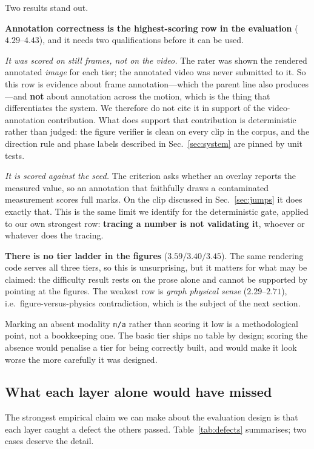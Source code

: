 \documentclass[conference]{IEEEtran}
\begin{document}
Two results stand out.

\textbf{Annotation correctness is the highest-scoring row in the evaluation}
($4.29$--$4.43$), and it needs two qualifications before it can be used.

\emph{It was scored on still frames, not on the video.} The rater was shown the
rendered annotated \emph{image} for each tier; the annotated video was never
submitted to it. So this row is evidence about frame annotation---which the
parent line also produces---and \textbf{not} about annotation across the
motion, which is the thing that differentiates the system. We therefore do not
cite it in support of the video-annotation contribution. What does support that
contribution is deterministic rather than judged: the figure verifier is clean
on every clip in the corpus, and the direction rule and phase labels described
in Sec.~\ref{sec:system} are pinned by unit tests.

\emph{It is scored against the seed.} The criterion asks whether an overlay
reports the measured value, so an annotation that faithfully draws a
contaminated measurement scores full marks. On the clip discussed in
Sec.~\ref{sec:jumps} it does exactly that. This is the same limit we identify
for the deterministic gate, applied to our own strongest row: \textbf{tracing a
number is not validating it}, whoever or whatever does the tracing.

\textbf{There is no tier ladder in the figures} ($3.59 / 3.40 / 3.45$). The
same rendering code serves all three tiers, so this is unsurprising, but it
matters for what may be claimed: the difficulty result rests on the prose
alone and cannot be supported by pointing at the figures. The weakest row is
\emph{graph physical sense} ($2.29$--$2.71$), i.e.\ figure-versus-physics
contradiction, which is the subject of the next section.

Marking an absent modality \texttt{n/a} rather than scoring it low is a
methodological point, not a bookkeeping one. The basic tier ships no table by
design; scoring the absence would penalise a tier for being correctly built,
and would make it look worse the more carefully it was designed.

\subsection{What each layer alone would have missed}
\label{sec:defects}
\label{sec:jumps}

The strongest empirical claim we can make about the evaluation design is that
each layer caught a defect the others passed. Table~\ref{tab:defects}
summarises; two cases deserve the detail.
\end{document}
